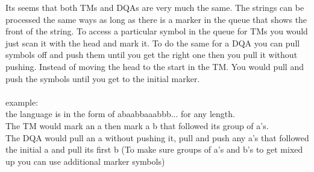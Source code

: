 \documentclass{article}
\begin{document}
Its seems that both TMs and DQAs are very much the same. 
The strings can be processed the same ways as long as there is a marker in the queue
that shows the front of the string. To access a particular symbol in the queue for TMs
you would just scan it with the head and mark it. To do the same for a DQA you can pull symbols
off and push them until you get the right one then you pull it without pushing. 
Instead of moving the head to the start in the TM. You would pull and push the symbols until 
you get to the initial marker. \\ \ \\

example: \\
the language is in the form of abaabbaaabbb... for any length. \\

The TM would mark an a then mark a b that followed its group of a's. \\

The DQA would pull an a without pushing it, pull and push any a's that followed the initial a 
and pull its first b (To make sure groups of a's and b's to get mixed up 
you can use additional marker symbols)
\end{document}
